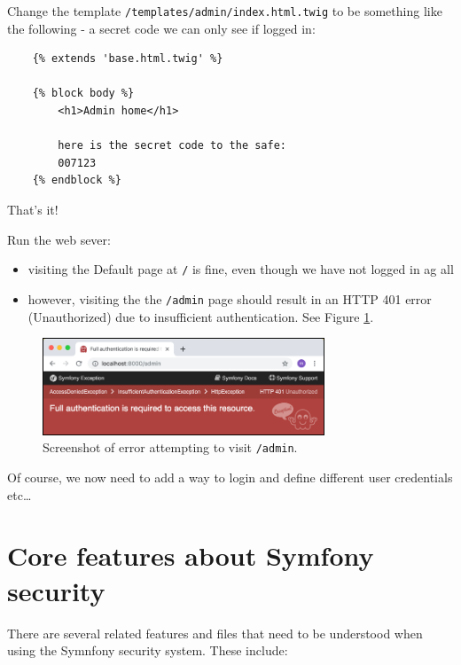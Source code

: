 \documentclass[a4paperpaper,openright]{book}
\begin{document}
Change the template \texttt{/templates/admin/index.html.twig} to be
something like the following - a secret code we can only see if logged
in:

\begin{verbatim}
    {% extends 'base.html.twig' %}

    {% block body %}
        <h1>Admin home</h1>

        here is the secret code to the safe:
        007123
    {% endblock %}
\end{verbatim}

That's it!

Run the web sever:

\begin{itemize}
\item
  visiting the Default page at \texttt{/} is fine, even though we have
  not logged in ag all
\item
  however, visiting the the \texttt{/admin} page should result in an
  HTTP 401 error (Unauthorized) due to insufficient authentication. See
  Figure \ref{not_authorised}.
\end{itemize}

\begin{figure}
\centering
\includegraphics[width=0.75\textwidth,height=\textheight]{./tex2pdf.-65f13e14688ab55b/1f857b19819be887adb09dafdce063deff3936e3.png}
\caption{Screenshot of error attempting to visit \texttt{/admin}.
\label{not_authorised}}
\end{figure}

Of course, we now need to add a way to login and define different user
credentials etc\ldots{}

\hypertarget{core-features-about-symfony-security}{%
\section{Core features about Symfony
security}\label{core-features-about-symfony-security}}

There are several related features and files that need to be understood
when using the Symnfony security system. These include:
\end{document}
